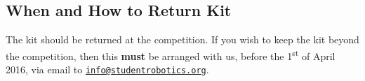 \subsection {When and How to Return Kit}

The kit should be returned at the competition.
If you wish to keep the kit beyond the competition, then this \textbf{must} be arranged with us,
 before the 1\textsuperscript{st} of April 2016, via email to \href{mailto:info@studentrobotics.org}{\nolinkurl{info@studentrobotics.org}}.

